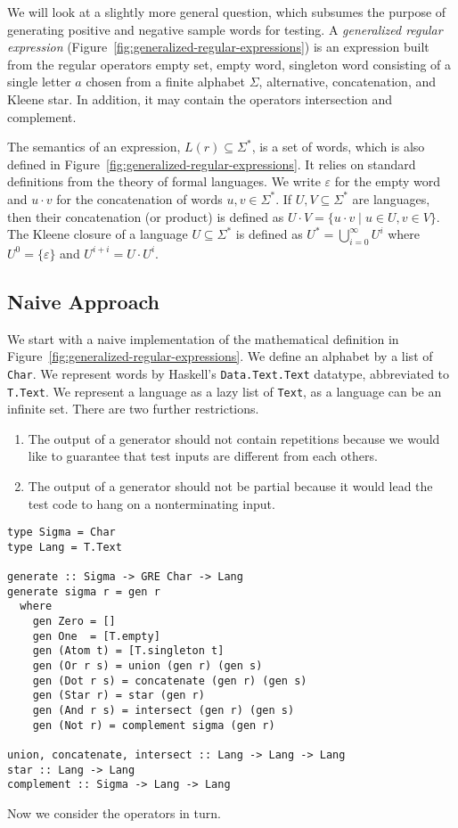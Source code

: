 We will look at a slightly more general question, which subsumes the
purpose of generating positive and negative sample words for
testing. A \emph{generalized regular expression}
(Figure~\ref{fig:generalized-regular-expressions}) is an expression
built from the regular operators empty set, empty word, singleton word
consisting of a single letter $a$ chosen from a finite alphabet
$\Sigma$, alternative, concatenation, and Kleene star. In addition, it
may contain the operators intersection and complement.

The semantics of an expression, $L(r) \subseteq \Sigma^*$, is a set of
words, which is also defined in
Figure~\ref{fig:generalized-regular-expressions}. It relies on
standard definitions from the theory of formal languages. We write
$\varepsilon$ for the empty word and $u\cdot v$ for the concatenation
of words $u, v \in \Sigma^*$. If $U, V \subseteq \Sigma^*$ are
languages, then their concatenation (or product) is defined as $U\cdot
V = \{ u\cdot v \mid u\in U, v\in V\}$. The Kleene closure of a
language $U\subseteq \Sigma^*$ is defined as $U^* =
\bigcup_{i=0}^\infty U^i$ where $U^0 = \{\varepsilon\}$ and $U^{i+i} =
U \cdot U^i$. 

\subsection{Naive Approach}
\label{sec:naive-approach}

We start with a naive implementation of the mathematical definition in
Figure~\ref{fig:generalized-regular-expressions}. We define an
alphabet by a list of \texttt{Char}.  We represent words by Haskell's
\texttt{Data.Text.Text} datatype, abbreviated to \texttt{T.Text}. We
represent a language as a lazy list of \texttt{Text}, as a language
can be an infinite set. There are two further restrictions.
\begin{enumerate}
\item The output of a generator should not contain repetitions
  because we would like to guarantee that test inputs are different
  from each others.
\item The output of a generator should not be partial because it would
  lead the test code to hang on a nonterminating input.
\end{enumerate}
\begin{verbatim}
type Sigma = Char
type Lang = T.Text

generate :: Sigma -> GRE Char -> Lang
generate sigma r = gen r
  where
    gen Zero = []
    gen One  = [T.empty]
    gen (Atom t) = [T.singleton t]
    gen (Or r s) = union (gen r) (gen s)
    gen (Dot r s) = concatenate (gen r) (gen s)
    gen (Star r) = star (gen r)
    gen (And r s) = intersect (gen r) (gen s)
    gen (Not r) = complement sigma (gen r)

union, concatenate, intersect :: Lang -> Lang -> Lang
star :: Lang -> Lang
complement :: Sigma -> Lang -> Lang
\end{verbatim}
Now we consider the operators in turn.

